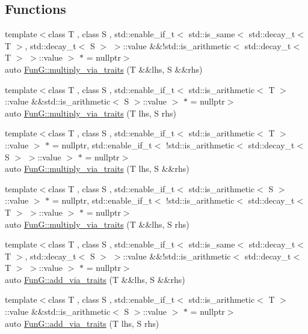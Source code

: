 \subsection*{Functions}
\begin{DoxyCompactItemize}
\item 
{\footnotesize template$<$class T , class S , std\-::enable\-\_\-if\-\_\-t$<$ std\-::is\-\_\-same$<$ std\-::decay\-\_\-t$<$ T $>$, std\-::decay\-\_\-t$<$ S $>$ $>$\-::value \&\&!std\-::is\-\_\-arithmetic$<$ std\-::decay\-\_\-t$<$ T $>$ $>$\-::value $>$ $\ast$  = nullptr$>$ }\\auto \hyperlink{namespaceFunG_a839a72c59a888ed89d3efe38897cc376}{Fun\-G\-::multiply\-\_\-via\-\_\-traits} (T \&\&lhs, S \&\&rhs)
\item 
{\footnotesize template$<$class T , class S , std\-::enable\-\_\-if\-\_\-t$<$ std\-::is\-\_\-arithmetic$<$ T $>$\-::value \&\&std\-::is\-\_\-arithmetic$<$ S $>$\-::value $>$ $\ast$  = nullptr$>$ }\\auto \hyperlink{namespaceFunG_a95f9f46143d0a53a378f776e300c3520}{Fun\-G\-::multiply\-\_\-via\-\_\-traits} (T lhs, S rhs)
\item 
{\footnotesize template$<$class T , class S , std\-::enable\-\_\-if\-\_\-t$<$ std\-::is\-\_\-arithmetic$<$ T $>$\-::value $>$ $\ast$  = nullptr, std\-::enable\-\_\-if\-\_\-t$<$ !std\-::is\-\_\-arithmetic$<$ std\-::decay\-\_\-t$<$ S $>$ $>$\-::value $>$ $\ast$  = nullptr$>$ }\\auto \hyperlink{namespaceFunG_a780ef12ebddaa8e729d8629d24ae76c5}{Fun\-G\-::multiply\-\_\-via\-\_\-traits} (T lhs, S \&\&rhs)
\item 
{\footnotesize template$<$class T , class S , std\-::enable\-\_\-if\-\_\-t$<$ std\-::is\-\_\-arithmetic$<$ S $>$\-::value $>$ $\ast$  = nullptr, std\-::enable\-\_\-if\-\_\-t$<$ !std\-::is\-\_\-arithmetic$<$ std\-::decay\-\_\-t$<$ T $>$ $>$\-::value $>$ $\ast$  = nullptr$>$ }\\auto \hyperlink{namespaceFunG_af9f50220300eacbd554ec4b48373535b}{Fun\-G\-::multiply\-\_\-via\-\_\-traits} (T \&\&lhs, S rhs)
\item 
{\footnotesize template$<$class T , class S , std\-::enable\-\_\-if\-\_\-t$<$ std\-::is\-\_\-same$<$ std\-::decay\-\_\-t$<$ T $>$, std\-::decay\-\_\-t$<$ S $>$ $>$\-::value \&\&!std\-::is\-\_\-arithmetic$<$ std\-::decay\-\_\-t$<$ T $>$ $>$\-::value $>$ $\ast$  = nullptr$>$ }\\auto \hyperlink{namespaceFunG_a1aa47c6870754d5d74100568cd3ef532}{Fun\-G\-::add\-\_\-via\-\_\-traits} (T \&\&lhs, S \&\&rhs)
\item 
{\footnotesize template$<$class T , class S , std\-::enable\-\_\-if\-\_\-t$<$ std\-::is\-\_\-arithmetic$<$ T $>$\-::value \&\&std\-::is\-\_\-arithmetic$<$ S $>$\-::value $>$ $\ast$  = nullptr$>$ }\\auto \hyperlink{namespaceFunG_a6cbaa3b1b61e5834b38db5c831e3c25e}{Fun\-G\-::add\-\_\-via\-\_\-traits} (T lhs, S rhs)
\end{DoxyCompactItemize}
